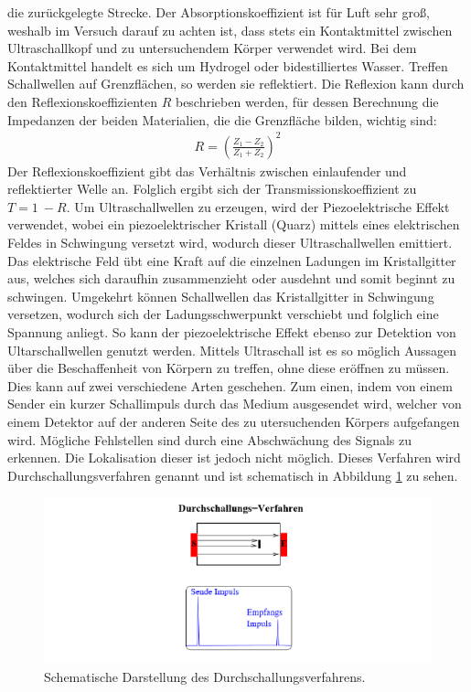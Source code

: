 die zurückgelegte Strecke.
Der Absorptionskoeffizient ist für Luft sehr groß, weshalb im Versuch darauf zu achten ist, dass
stets ein Kontaktmittel zwischen Ultraschallkopf und zu untersuchendem Körper verwendet wird.
Bei dem Kontaktmittel handelt es sich um Hydrogel oder bidestilliertes Wasser.
Treffen Schallwellen auf Grenzflächen, so werden sie reflektiert. Die Reflexion kann durch den
Reflexionskoeffizienten $R$ beschrieben werden, für dessen Berechnung die Impedanzen der beiden
Materialien, die die Grenzfläche bilden, wichtig sind:
\FloatBarrier
\begin{align*}
  R = \left(\frac{Z_1 - Z_2}{Z_1 + Z_2} \right)^2
\end{align*}
\FloatBarrier
Der Reflexionskoeffizient gibt das Verhältnis zwischen einlaufender und reflektierter Welle an.
Folglich ergibt sich der Transmissionskoeffizient zu $T = 1 ~ - R$.
Um Ultraschallwellen zu erzeugen, wird der Piezoelektrische Effekt verwendet, wobei ein piezoelektrischer
Kristall (Quarz) mittels eines elektrischen Feldes in Schwingung versetzt wird, wodurch dieser
Ultraschallwellen emittiert. Das elektrische Feld übt eine Kraft auf die einzelnen Ladungen im Kristallgitter aus,
welches sich daraufhin zusammenzieht oder ausdehnt und somit beginnt zu schwingen. Umgekehrt können Schallwellen
das Kristallgitter in Schwingung versetzen, wodurch sich der Ladungsschwerpunkt verschiebt und folglich eine
Spannung anliegt. So kann der piezoelektrische Effekt ebenso zur Detektion von Ultarschallwellen genutzt werden.
Mittels Ultraschall ist es so möglich Aussagen über die Beschaffenheit von Körpern zu treffen, ohne diese eröffnen
zu müssen.
Dies kann auf zwei verschiedene Arten geschehen. Zum einen, indem von einem Sender ein kurzer Schallimpuls durch das
Medium ausgesendet wird, welcher von einem Detektor auf der anderen Seite des zu utersuchenden Körpers aufgefangen wird.
Mögliche Fehlstellen sind durch eine Abschwächung des Signals zu erkennen. Die Lokalisation dieser ist jedoch nicht möglich.
Dieses Verfahren wird Durchschallungsverfahren genannt und ist schematisch in Abbildung \ref{abb1} zu sehen.
\FloatBarrier
\begin{figure}
  \centering
  \includegraphics[scale=0.8]{1.PNG}
  \caption{Schematische Darstellung des Durchschallungsverfahrens.}
  \label{abb1}
\end{figure}
